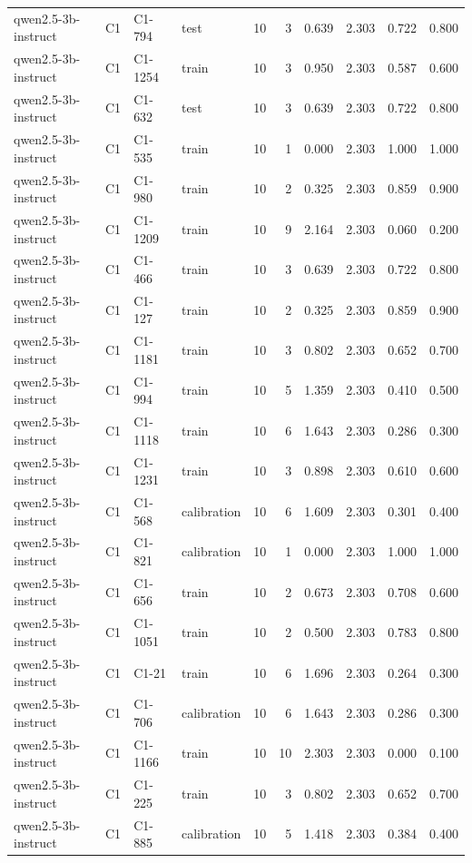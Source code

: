 \begin{table}
\begin{tabular}{llllrrrrrr}
qwen2.5-3b-instruct & C1 & C1-794 & test & 10 & 3 & 0.639 & 2.303 & 0.722 & 0.800 \\
qwen2.5-3b-instruct & C1 & C1-1254 & train & 10 & 3 & 0.950 & 2.303 & 0.587 & 0.600 \\
qwen2.5-3b-instruct & C1 & C1-632 & test & 10 & 3 & 0.639 & 2.303 & 0.722 & 0.800 \\
qwen2.5-3b-instruct & C1 & C1-535 & train & 10 & 1 & 0.000 & 2.303 & 1.000 & 1.000 \\
qwen2.5-3b-instruct & C1 & C1-980 & train & 10 & 2 & 0.325 & 2.303 & 0.859 & 0.900 \\
qwen2.5-3b-instruct & C1 & C1-1209 & train & 10 & 9 & 2.164 & 2.303 & 0.060 & 0.200 \\
qwen2.5-3b-instruct & C1 & C1-466 & train & 10 & 3 & 0.639 & 2.303 & 0.722 & 0.800 \\
qwen2.5-3b-instruct & C1 & C1-127 & train & 10 & 2 & 0.325 & 2.303 & 0.859 & 0.900 \\
qwen2.5-3b-instruct & C1 & C1-1181 & train & 10 & 3 & 0.802 & 2.303 & 0.652 & 0.700 \\
qwen2.5-3b-instruct & C1 & C1-994 & train & 10 & 5 & 1.359 & 2.303 & 0.410 & 0.500 \\
qwen2.5-3b-instruct & C1 & C1-1118 & train & 10 & 6 & 1.643 & 2.303 & 0.286 & 0.300 \\
qwen2.5-3b-instruct & C1 & C1-1231 & train & 10 & 3 & 0.898 & 2.303 & 0.610 & 0.600 \\
qwen2.5-3b-instruct & C1 & C1-568 & calibration & 10 & 6 & 1.609 & 2.303 & 0.301 & 0.400 \\
qwen2.5-3b-instruct & C1 & C1-821 & calibration & 10 & 1 & 0.000 & 2.303 & 1.000 & 1.000 \\
qwen2.5-3b-instruct & C1 & C1-656 & train & 10 & 2 & 0.673 & 2.303 & 0.708 & 0.600 \\
qwen2.5-3b-instruct & C1 & C1-1051 & train & 10 & 2 & 0.500 & 2.303 & 0.783 & 0.800 \\
qwen2.5-3b-instruct & C1 & C1-21 & train & 10 & 6 & 1.696 & 2.303 & 0.264 & 0.300 \\
qwen2.5-3b-instruct & C1 & C1-706 & calibration & 10 & 6 & 1.643 & 2.303 & 0.286 & 0.300 \\
qwen2.5-3b-instruct & C1 & C1-1166 & train & 10 & 10 & 2.303 & 2.303 & 0.000 & 0.100 \\
qwen2.5-3b-instruct & C1 & C1-225 & train & 10 & 3 & 0.802 & 2.303 & 0.652 & 0.700 \\
qwen2.5-3b-instruct & C1 & C1-885 & calibration & 10 & 5 & 1.418 & 2.303 & 0.384 & 0.400 \\

\end{tabular}
\end{table}
